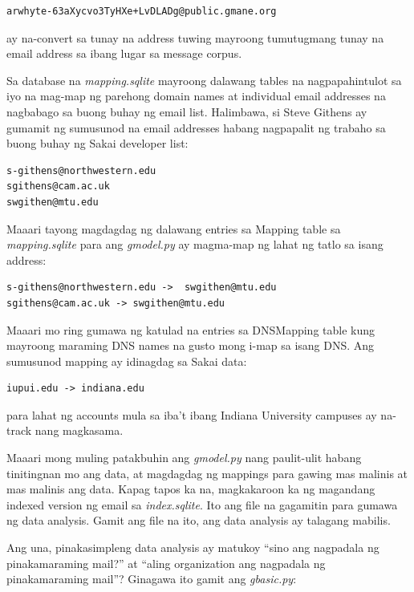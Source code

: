 \documentclass[10pt,]{book}
\begin{document}
{\small
\begin{verbatim}
arwhyte-63aXycvo3TyHXe+LvDLADg@public.gmane.org
\end{verbatim}
}

ay na-convert sa tunay na address tuwing mayroong tumutugmang tunay na
email address sa ibang lugar sa message corpus.

Sa database na \emph{mapping.sqlite} mayroong dalawang tables na
nagpapahintulot sa iyo na mag-map ng parehong domain names at individual
email addresses na nagbabago sa buong buhay ng email list. Halimbawa, si
Steve Githens ay gumamit ng sumusunod na email addresses habang
nagpapalit ng trabaho sa buong buhay ng Sakai developer list:

{\small
\begin{verbatim}
s-githens@northwestern.edu
sgithens@cam.ac.uk
swgithen@mtu.edu
\end{verbatim}
}

Maaari tayong magdagdag ng dalawang entries sa Mapping table sa
\emph{mapping.sqlite} para ang \emph{gmodel.py} ay magma-map ng lahat ng
tatlo sa isang address:

{\small
\begin{verbatim}
s-githens@northwestern.edu ->  swgithen@mtu.edu
sgithens@cam.ac.uk -> swgithen@mtu.edu
\end{verbatim}
}

Maaari mo ring gumawa ng katulad na entries sa DNSMapping table kung
mayroong maraming DNS names na gusto mong i-map sa isang DNS. Ang
sumusunod mapping ay idinagdag sa Sakai data:

{\small
\begin{verbatim}
iupui.edu -> indiana.edu
\end{verbatim}
}

para lahat ng accounts mula sa iba't ibang Indiana University campuses
ay na-track nang magkasama.

Maaari mong muling patakbuhin ang \emph{gmodel.py} nang paulit-ulit
habang tinitingnan mo ang data, at magdagdag ng mappings para gawing mas
malinis at mas malinis ang data. Kapag tapos ka na, magkakaroon ka ng
magandang indexed version ng email sa \emph{index.sqlite}. Ito ang file
na gagamitin para gumawa ng data analysis. Gamit ang file na ito, ang
data analysis ay talagang mabilis.

Ang una, pinakasimpleng data analysis ay matukoy ``sino ang nagpadala ng
pinakamaraming mail?'' at ``aling organization ang nagpadala ng
pinakamaraming mail''? Ginagawa ito gamit ang \emph{gbasic.py}:
\end{document}
